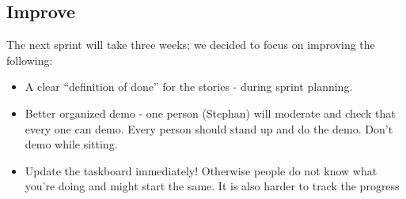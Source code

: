 \documentclass[11pt,a4paper]{article}
\begin{document}
\subsection{Improve}
The next sprint will take three weeks; we decided to focus on improving the following:
\begin{itemize}
 \item A clear ``definition of done'' for the stories - during sprint planning.
 \item Better organized demo - one person (Stephan) will moderate and check that every one can demo.
       Every person should stand up and do the demo. Don't demo while sitting.
 \item Update the taskboard immediately! Otherwise people do not know what you're doing and might start the same.
       It is also harder to track the progress
\end{itemize}
\end{document}
